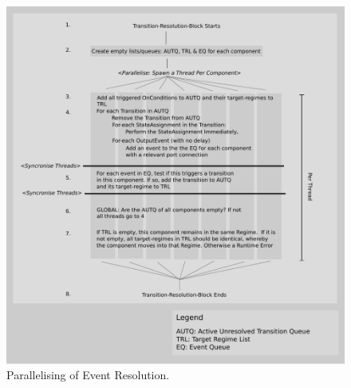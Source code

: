\documentclass{article}
\begin{document}
\begin{figure}[htb!]
\center
\includegraphics[width=14cm]{images/ParallelisingTransitions.pdf}
\protect\caption{Parallelising of Event Resolution.}
\label{ParallelisingTransitions}
\end{figure}


%
\end{document}
